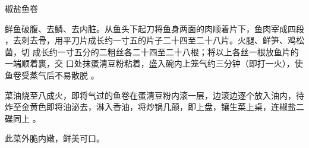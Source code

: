 \begin{recipe}{椒盐鱼卷}

\ingredients


\preparation

\step 鲜鱼破腹、去鳞、去内脏。从鱼头下起刀将鱼身两面的肉顺着片下，鱼肉宰成四段
，去刺去骨，用平刀片成长约一寸五的片子二十四至二十八片。火腿、鲜笋、鸡松菌，切
成长约一寸五分的二粗丝各二十四至二十八根；将以上各丝一根放鱼片的一端顺着裹，交
口处抹蛋清豆粉粘着，盛入碗内上笼气约三分钟（即打一火），使鱼卷受蒸气后不易散脱
。

\step 菜油烧至八成火，即将气过的鱼卷在蛋清豆粉内滚一层，边滚边逐个放入油内，待
炸至金黄色即将油泌去，淋入香油，将炒锅几颠，即上盘，镶生菜上桌，连椒盐二碟同上
。

\features

此菜外脆内嫩，鲜美可口。

\end{recipe}

